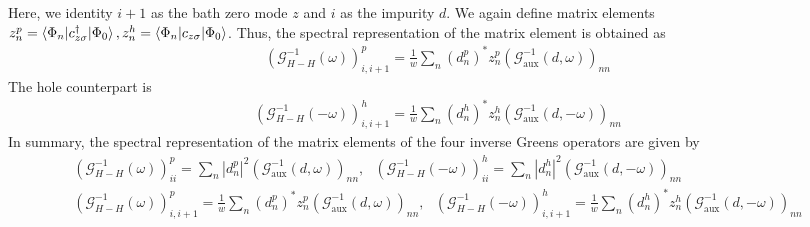 \documentclass[10pt]{report}
\numberwithin{equation}{section}
\begin{document}
Here, we identity \(i+1\) as the bath zero mode \(z\) and \(i\) as the impurity \(d\). We again define matrix elements \(z_n^p = \braket{\Phi_n | c^\dagger_{z\sigma} | \Phi_0}, z_n^h = \braket{\Phi_n | c_{z\sigma} | \Phi_0}\). Thus, the spectral representation of the matrix element is obtained as
\begin{equation}\begin{aligned}
	\left(\mathcal{G}^{-1}_{H-H}\left(\omega\right) \right)^p_{i,i+1} = \frac{1}{w} \sum_n \left(d^p_n\right)^* z^p_n \left(\mathcal{G}^{-1}_\text{aux}(d, \omega) \right)_{nn}
\end{aligned}\end{equation}
The hole counterpart is
\begin{equation}\begin{aligned}
	\left(\mathcal{G}^{-1}_{H-H}\left(-\omega\right) \right)^h_{i,i+1} = \frac{1}{w} \sum_n \left(d^h_n\right)^* z^h_n \left(\mathcal{G}^{-1}_\text{aux}(d, -\omega) \right)_{nn}
\end{aligned}\end{equation}
In summary, the spectral representation of the matrix elements of the four inverse Greens operators are given by
\begin{gather}
\label{green_eq_final_siam}
	\left(\mathcal{G}^{-1}_{H-H}(\omega)\right)^p_{ii} = \sum_{n} |d^p_n|^2 \left(\mathcal{G}^{-1}_\text{aux}(d, \omega)\right)_{nn}, ~ ~ ~ \left(\mathcal{G}^{-1}_{H-H}(-\omega)\right)^h_{ii} = \sum_{n} |d^h_n|^2 \left(\mathcal{G}^{-1}_\text{aux}(d, -\omega)\right)_{nn}\\
	\left(\mathcal{G}^{-1}_{H-H}\left(\omega\right) \right)^p_{i,i+1} = \frac{1}{w} \sum_n \left(d^p_n\right)^* z^p_n \left(\mathcal{G}^{-1}_\text{aux}(d, \omega) \right)_{nn}, ~ ~ ~ \left(\mathcal{G}^{-1}_{H-H}\left(-\omega\right) \right)^h_{i,i+1} = \frac{1}{w} \sum_n \left(d^h_n\right)^* z^h_n \left(\mathcal{G}^{-1}_\text{aux}(d, -\omega) \right)_{nn}
\end{gather}
\end{document}

